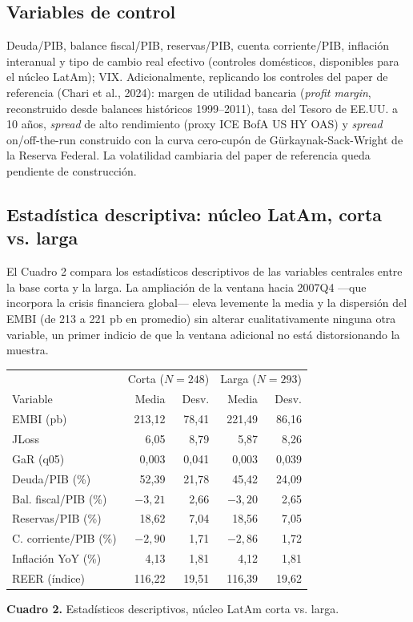 \documentclass[5p,times,twocolumn,authoryear]{elsarticle}
\begin{document}
\subsection{Variables de control}
Deuda/PIB, balance fiscal/PIB, reservas/PIB, cuenta corriente/PIB, inflación interanual y tipo de cambio real efectivo (controles domésticos, disponibles para el núcleo LatAm); VIX. Adicionalmente, replicando los controles del paper de referencia (Chari et al., 2024): margen de utilidad bancaria (\textit{profit margin}, reconstruido desde balances históricos 1999–2011), tasa del Tesoro de EE.UU. a 10 años, \textit{spread} de alto rendimiento (proxy ICE BofA US HY OAS) y \textit{spread} on/off-the-run construido con la curva cero-cupón de Gürkaynak-Sack-Wright de la Reserva Federal. La volatilidad cambiaria del paper de referencia queda pendiente de construcción.

\subsection{Estadística descriptiva: núcleo LatAm, corta vs. larga}

El Cuadro 2 compara los estadísticos descriptivos de las variables centrales entre la base corta y la larga. La ampliación de la ventana hacia 2007Q4 —que incorpora la crisis financiera global— eleva levemente la media y la dispersión del EMBI (de 213 a 221 pb en promedio) sin alterar cualitativamente ninguna otra variable, un primer indicio de que la ventana adicional no está distorsionando la muestra.

\begin{center}
\footnotesize
\begin{tabular}{lrrrr}
\toprule
 & \multicolumn{2}{c}{Corta ($N=248$)} & \multicolumn{2}{c}{Larga ($N=293$)} \\
Variable & Media & Desv. & Media & Desv. \\
\midrule
EMBI (pb)     & 213,12 & 78,41 & 221,49 & 86,16 \\
JLoss         & 6,05   & 8,79  & 5,87   & 8,26  \\
GaR (q05)     & 0,003  & 0,041 & 0,003  & 0,039 \\
Deuda/PIB (\%)& 52,39  & 21,78 & 45,42  & 24,09 \\
Bal. fiscal/PIB (\%) & $-3,21$ & 2,66 & $-3,20$ & 2,65 \\
Reservas/PIB (\%)    & 18,62 & 7,04 & 18,56 & 7,05 \\
C. corriente/PIB (\%)& $-2,90$ & 1,71 & $-2,86$ & 1,72 \\
Inflación YoY (\%)   & 4,13 & 1,81 & 4,12 & 1,81 \\
REER (índice)        & 116,22 & 19,51 & 116,39 & 19,62 \\
\bottomrule
\end{tabular}

\medskip
\footnotesize\textbf{Cuadro 2.} Estadísticos descriptivos, núcleo LatAm corta vs. larga.
\end{center}
\end{document}
